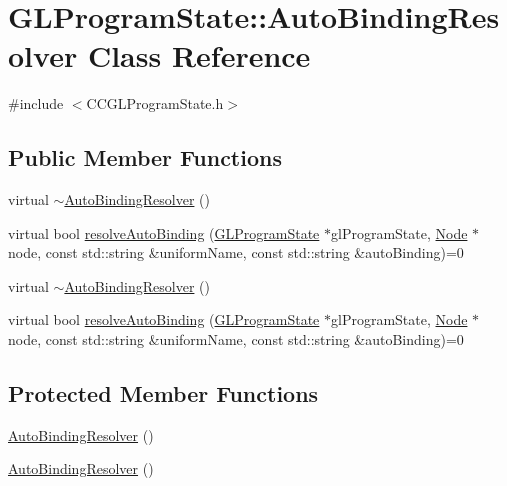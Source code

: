 \hypertarget{classGLProgramState_1_1AutoBindingResolver}{}\section{G\+L\+Program\+State\+:\+:Auto\+Binding\+Resolver Class Reference}
\label{classGLProgramState_1_1AutoBindingResolver}


{\ttfamily \#include $<$C\+C\+G\+L\+Program\+State.\+h$>$}

\subsection*{Public Member Functions}
\begin{DoxyCompactItemize}
\item 
virtual \hyperlink{classGLProgramState_1_1AutoBindingResolver_ac396b30720f4b0cbbdc9f696f55cea8c}{$\sim$\+Auto\+Binding\+Resolver} ()
\item 
virtual bool \hyperlink{classGLProgramState_1_1AutoBindingResolver_af05a384559d21bc985414d2277075178}{resolve\+Auto\+Binding} (\hyperlink{classGLProgramState}{G\+L\+Program\+State} $\ast$gl\+Program\+State, \hyperlink{classNode}{Node} $\ast$node, const std\+::string \&uniform\+Name, const std\+::string \&auto\+Binding)=0
\item 
virtual \hyperlink{classGLProgramState_1_1AutoBindingResolver_ab41a254f7728f8a24761a56cdaa1df17}{$\sim$\+Auto\+Binding\+Resolver} ()
\item 
virtual bool \hyperlink{classGLProgramState_1_1AutoBindingResolver_af05a384559d21bc985414d2277075178}{resolve\+Auto\+Binding} (\hyperlink{classGLProgramState}{G\+L\+Program\+State} $\ast$gl\+Program\+State, \hyperlink{classNode}{Node} $\ast$node, const std\+::string \&uniform\+Name, const std\+::string \&auto\+Binding)=0
\end{DoxyCompactItemize}
\subsection*{Protected Member Functions}
\begin{DoxyCompactItemize}
\item 
\hyperlink{classGLProgramState_1_1AutoBindingResolver_a8d74ab1028fb55fb058874954f3f5985}{Auto\+Binding\+Resolver} ()
\item 
\hyperlink{classGLProgramState_1_1AutoBindingResolver_a8d74ab1028fb55fb058874954f3f5985}{Auto\+Binding\+Resolver} ()
\end{DoxyCompactItemize}


